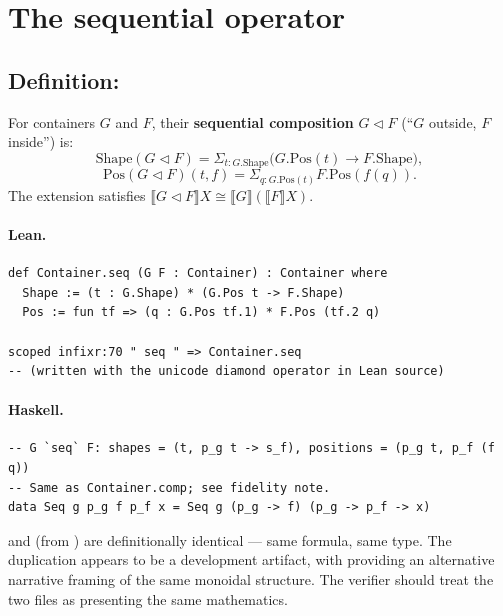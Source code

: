 \documentclass[11pt,a4paper]{article}
\begin{document}
\section{The sequential operator}

\subsection{Definition: }

\begin{defn}
For containers $G$ and $F$, their \textbf{sequential composition}
$G \triangleleft F$ (``$G$ outside, $F$ inside'') is:
\[
  \mathrm{Shape}(G \triangleleft F) = \Sigma_{t : G.\mathrm{Shape}}
    \bigl(G.\mathrm{Pos}(t) \to F.\mathrm{Shape}\bigr),
\]
\[
  \mathrm{Pos}(G \triangleleft F)(t, f) = \Sigma_{q : G.\mathrm{Pos}(t)}
    F.\mathrm{Pos}(f(q)).
\]
The extension satisfies $\llbracket G \triangleleft F \rrbracket X \cong
\llbracket G \rrbracket(\llbracket F \rrbracket X)$.
\end{defn}

\paragraph{Lean.}
\begin{lstlisting}[style=lean]
def Container.seq (G F : Container) : Container where
  Shape := (t : G.Shape) * (G.Pos t -> F.Shape)
  Pos := fun tf => (q : G.Pos tf.1) * F.Pos (tf.2 q)

scoped infixr:70 " seq " => Container.seq
-- (written with the unicode diamond operator in Lean source)
\end{lstlisting}

\paragraph{Haskell.}
\begin{lstlisting}[style=haskell]
-- G `seq` F: shapes = (t, p_g t -> s_f), positions = (p_g t, p_f (f q))
-- Same as Container.comp; see fidelity note.
data Seq g p_g f p_f x = Seq g (p_g -> f) (p_g -> p_f -> x)
\end{lstlisting}

\begin{fidelitynote}
 and  (from )
are definitionally identical --- same formula, same type.  The duplication
appears to be a development artifact, with  providing
an alternative narrative framing of the same monoidal structure.  The
verifier should treat the two files as presenting the same mathematics.
\end{fidelitynote}
\end{document}
